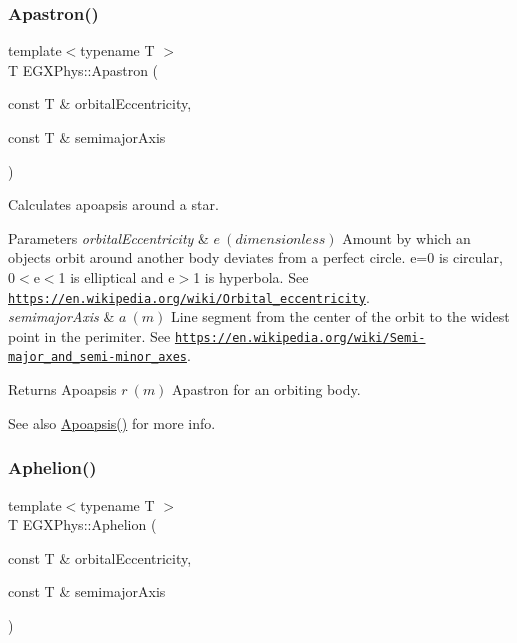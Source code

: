 \subsubsection{\texorpdfstring{Apastron()}{Apastron()}}
{\footnotesize\ttfamily template$<$typename T $>$ \\
T E\+G\+X\+Phys\+::\+Apastron (\begin{DoxyParamCaption}\item[{const T \&}]{orbital\+Eccentricity,  }\item[{const T \&}]{semimajor\+Axis }\end{DoxyParamCaption})}



Calculates apoapsis around a star. 


\begin{DoxyParams}{Parameters}
{\em orbital\+Eccentricity} & $ e\ (dimensionless)$ Amount by which an objects orbit around another body deviates from a perfect circle. e=0 is circular, 0$<$e$<$1 is elliptical and e$>$1 is hyperbola. See \href{https://en.wikipedia.org/wiki/Orbital_eccentricity}{\tt https\+://en.\+wikipedia.\+org/wiki/\+Orbital\+\_\+eccentricity}. \\
\hline
{\em semimajor\+Axis} & $ a\ (m)$ Line segment from the center of the orbit to the widest point in the perimiter. See \href{https://en.wikipedia.org/wiki/Semi-major_and_semi-minor_axes}{\tt https\+://en.\+wikipedia.\+org/wiki/\+Semi-\/major\+\_\+and\+\_\+semi-\/minor\+\_\+axes}. \\
\hline
\end{DoxyParams}
\begin{DoxyReturn}{Returns}
Apoapsis $ r\ (m)$ Apastron for an orbiting body. 
\end{DoxyReturn}
\begin{DoxySeeAlso}{See also}
\mbox{\hyperlink{group___e_g_x_phys-_apoapsis_gaf962e650bf84a568458e8eb39b1c61ba}{Apoapsis()}} for more info. 
\end{DoxySeeAlso}
\mbox{\label{group___e_g_x_phys-_apoapsis_ga77dadb4d082a441c8e85203c983722c7}} 
\subsubsection{\texorpdfstring{Aphelion()}{Aphelion()}}
{\footnotesize\ttfamily template$<$typename T $>$ \\
T E\+G\+X\+Phys\+::\+Aphelion (\begin{DoxyParamCaption}\item[{const T \&}]{orbital\+Eccentricity,  }\item[{const T \&}]{semimajor\+Axis }\end{DoxyParamCaption})}



